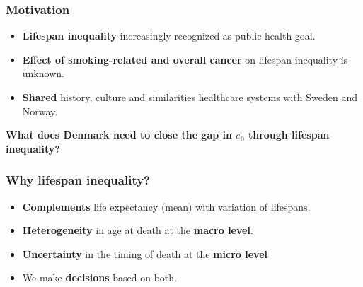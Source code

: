 \documentclass[xcolor={dvipsnames}]{beamer}
\begin{document}
\begin{frame}\frametitle{Motivation}
\large{
		\begin{itemize}
		
		\item \textbf{Lifespan inequality} increasingly recognized as public health goal.\pause
		
		\item \textbf{Effect of smoking-related and overall cancer} on lifespan inequality is unknown. \pause
		
		\item \textbf{Shared} history, culture and similarities healthcare systems with Sweden and Norway. 
		\end{itemize}
		\pause
		
		\begin{center}
		\Large{\textbf{What does Denmark need to close the gap in $e_0$
		through lifespan inequality?}}
		\end{center}
		
}

\end{frame}




\begin{frame}\frametitle{Why lifespan inequality?}
\Large{
		\begin{itemize}
		
		\item<1-> \textbf{Complements} life expectancy (mean) with variation of lifespans.

		\item<2-> \textbf{Heterogeneity} in age at death at the \textbf{macro level}.
		
		\item<3-> \textbf{Uncertainty} in the timing of death at the \textbf{micro level}
		
		\item<4-> We make \textbf{decisions} based on both.
						
		\end{itemize}

}
\end{frame}
\end{document}
